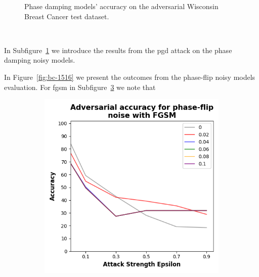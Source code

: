 \begin{figure}[!h]
\begin{subfigure}{0.45\textwidth}
      \label{fig:bc14}
  \end{subfigure}
  \caption{Phase damping models' accuracy on the adversarial Wisconsin Breast Cancer test dataset.}
  \label{fig:bc-1314}
\end{figure} \

In Subfigure~\ref{fig:bc14} we introduce the results from the \ac{pgd}
attack on the phase damping noisy models. \

In Figure~\ref{fig:bc-1516} we present the outcomes from the phase-flip
noisy models evaluation. For \ac{fgsm} in Subfigure~\ref{fig:bc15}
we note that \

\begin{figure}[!h]
  \centering

  \begin{subfigure}{0.45\textwidth}
      \includegraphics[width=\linewidth]{figures/evaluation_results/breast-cancer/pqc/figures/phase-flip-fgsm.png}
      \label{fig:bc15}
  \end{subfigure} \qquad
  \begin{subfigure}{0.45\textwidth}

\end{subfigure}
\end{figure}
